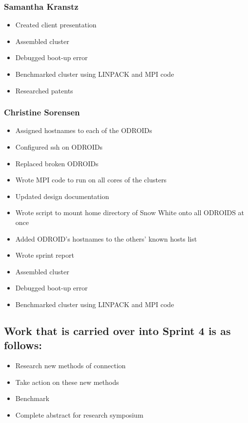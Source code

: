 \subsubsection*{Samantha Kranstz}
\begin{itemize}
	\item Created client presentation 
	\item Assembled cluster
	\item Debugged boot-up error
	\item Benchmarked cluster using LINPACK and MPI code
	\item Researched patents
\end{itemize}

\subsubsection*{Christine Sorensen}
\begin{itemize}
	\item Assigned hostnames to each of the ODROIDs
	\item Configured ssh on ODROIDs
	\item Replaced broken ODROIDs
	\item Wrote MPI code to run on all cores of the clusters
	\item Updated design documentation
	\item Wrote script to mount home directory of Snow White onto all ODROIDS at once
	\item Added ODROID's hostnames to the others' known hosts list
	\item Wrote sprint report 
	\item Assembled cluster
	\item Debugged boot-up error
	\item Benchmarked cluster using LINPACK and MPI code
\end{itemize}

\subsection*{Work that is carried over into Sprint 4 is as follows:}
\begin{itemize}
	\item Research new methods of connection
	\item Take action on these new methods
	\item Benchmark
	\item Complete abstract for research symposium
\end{itemize}

